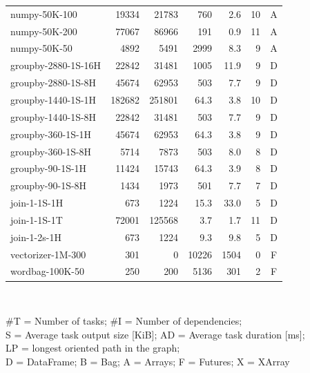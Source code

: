 \begin{table}
\begin{tabular}{l|rrrrrc}
		numpy-50K-100       & 19334        & 21783        & 760        & 2.6   & 10 & A \\
		numpy-50K-200       & 77067        & 86966        & 191        & 0.9   & 11 & A \\
		numpy-50K-50        & 4892         & 5491         & 2999       & 8.3   & 9  & A \\
		groupby-2880-1S-16H & 22842        & 31481        & 1005       & 11.9  & 9  & D \\
		groupby-2880-1S-8H  & 45674        & 62953        & 503        & 7.7   & 9  & D \\
		groupby-1440-1S-1H  & 182682       & 251801       & 64.3       & 3.8   & 10 & D \\
		groupby-1440-1S-8H  & 22842        & 31481        & 503        & 7.7   & 9  & D \\
		groupby-360-1S-1H   & 45674        & 62953        & 64.3       & 3.8   & 9  & D \\
		groupby-360-1S-8H   & 5714         & 7873         & 503        & 8.0   & 8  & D \\
		groupby-90-1S-1H    & 11424        & 15743        & 64.3       & 3.9   & 8  & D \\
		groupby-90-1S-8H    & 1434         & 1973         & 501        & 7.7   & 7  & D \\
		join-1-1S-1H        & 673          & 1224         & 15.3       & 33.0  & 5  & D \\
		join-1-1S-1T        & 72001        & 125568       & 3.7        & 1.7   & 11 & D \\
		join-1-2s-1H        & 673          & 1224         & 9.3        & 9.8   & 5  & D \\
		vectorizer-1M-300   & 301          & 0            & 10226      & 1504  & 0  & F \\
		wordbag-100K-50     & 250          & 200          & 5136       & 301   & 2  & F \\
		\bottomrule
	\end{tabular}\\
	\vspace{1mm}

	\#T = Number of tasks; \#I = Number of dependencies; \\
	S = Average task output size [KiB]; AD = Average task
	duration [ms]; \\ LP = longest oriented path in the graph; \\ D = DataFrame; B
	= Bag; A = Arrays; F = Futures; X = XArray
\end{table}

